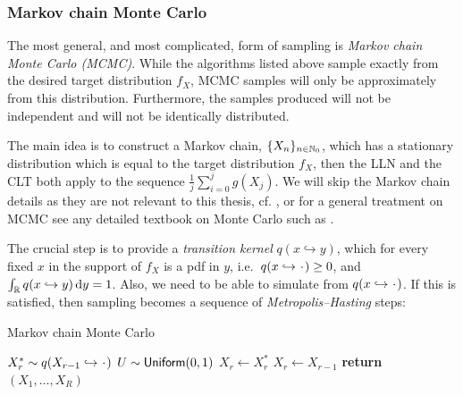 

\subsubsection{Markov chain Monte Carlo}

The most general, and most complicated, form of sampling is \emph{Markov chain Monte Carlo (MCMC)}. While the algorithms listed above sample exactly from the desired target distribution $f_X$, MCMC samples will only be approximately from this distribution. Furthermore, the samples produced will not be independent and will not be identically distributed.

The main idea is to construct a Markov chain, $\{ X_n \}_{n\in\mathbb{N}_0}$, which has a stationary distribution which is equal to the target distribution $f_X$, then the LLN and the CLT both apply to the sequence $\frac1j\sum_{i=0}^j g(X_j)$. We will skip the Markov chain details as they are not relevant to this thesis, cf. \cite{meyn2012markov}, or for a general treatment on MCMC see any detailed textbook on Monte Carlo such as \cite{asmussen2007stochastic,glasserman2003monte,kroese2013handbook}.

The crucial step is to provide a \emph{transition kernel} $q(x \hookrightarrow y)$, which for every fixed $x$ in the support of $f_X$ is a pdf in $y$, i.e.\ $q(x \hookrightarrow \argdot) \ge 0$, and $\int_{\mathbb{R}} q(x \hookrightarrow y) \mathop{}\!\mathrm{d} y = 1$. Also, we need to be able to simulate from $q(x \hookrightarrow \argdot)$. If this is satisfied, then sampling becomes a sequence of \emph{Metropolis--Hasting} steps:

\begin{algorithm}
\caption{Markov chain Monte Carlo}
\label{alg:mcmc}
\begin{algorithmic}[1]
\State $X_r^\ast \sim q(X_{r-1} \hookrightarrow \argdot)$
\State $U \sim \mathsf{Uniform}(0,1)$
\State $X_r \gets X_r^\ast$
\Else
\State $X_r \gets X_{r-1}$
\EndIf
\EndFor
\State \textbf{return} $(X_1, \dots, X_R)$
\EndFunction
\end{algorithmic}
\end{algorithm}

